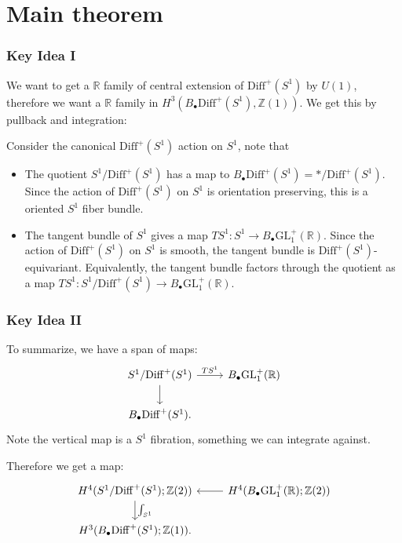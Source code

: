 \documentclass{beamer}
\newcommand{\Z}{\mathbb Z}
\newcommand{\R}{\mathbb R}
\newcommand{\GL}{\mathrm{GL}}
\newcommand{\Bdot}{B_\bullet}
\newcommand{\Diff}{\mathrm{Diff}^+(S^1)}
\begin{document}
\section{Main theorem}
\begin{frame}
    \frametitle{Key Idea I}
    We want to get a $\R$ family of central extension of $\Diff$ by $U(1)$, therefore 
    we want a $\R$ family in $H^3(\Bdot\Diff, \Z(1))$. We get this by pullback and integration: \pause 

    \vspace{5mm} 
    Consider the canonical $\Diff$ action on $S^1$, note that \pause
    \begin{itemize}
        \item <1 -> The quotient $S^1/\Diff$ has a map to $\Bdot\Diff = * /\Diff$.
        Since the action of $\Diff$ on $S^1$ is orientation preserving, this is a oriented 
        $S^1$ fiber bundle. \pause
        \item <2 -> The tangent bundle of $S^1$ gives a map $TS^1: S^1 \to \Bdot\GL^+_1(\R)$. Since
        the action of $\Diff$ on $S^1$ is smooth, the tangent bundle is $\Diff$-equivariant. Equivalently,
        the tangent bundle factors through the quotient as a map $TS^1: S^1/\Diff \to \Bdot \GL^+_1(\R)$.
    \end{itemize}
\end{frame}

\begin{frame}[fragile]
    \frametitle{Key Idea II}
    To summarize, we have a span of maps:
    \begin{equation}
        \begin{tikzcd}
        S^1/\Diff \arrow[r, "TS^1"] \arrow[d]
        & \Bdot\GL^+_1(\R) \\
        \Bdot\Diff.
        & 
        \end{tikzcd}
        \end{equation}
    Note the vertical map is a $S^1$ fibration, something we can integrate against. 

    Therefore we get a map:
    \begin{equation}
        \begin{tikzcd}
        H^4(S^1/\Diff; \Z(2))  \arrow[d, "\int_{S^1}"]
        & H^4(\Bdot \GL^+_1(\R); \Z(2)) \arrow[l]\\
        H^3(\Bdot\Diff; \Z(1)).
        & 
        \end{tikzcd}
        \end{equation} 
\end{frame}
\end{document}
